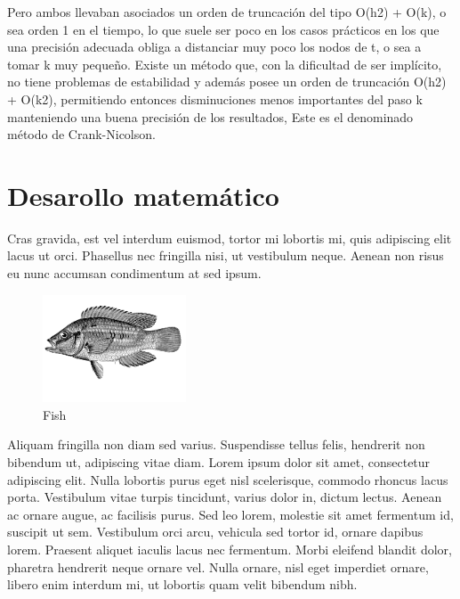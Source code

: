 \documentclass[11pt]{article} %
\begin{document}
Pero ambos llevaban asociados un orden de truncación del tipo O(h2) + O(k), o sea orden 1 en el tiempo, lo que suele ser poco en los casos prácticos en los que una precisión adecuada obliga a distanciar muy poco los nodos de t, o sea a tomar k muy pequeño. Existe un método que, con la dificultad de ser implícito, no tiene problemas de estabilidad y además posee un orden de truncación O(h2) + O(k2), permitiendo entonces disminuciones menos importantes del paso k manteniendo una buena precisión de los resultados, Este es el denominado método de Crank-Nicolson.


\section*{Desarollo matemático}

Cras gravida, est vel interdum euismod, tortor mi lobortis mi, quis adipiscing elit lacus ut orci. Phasellus nec fringilla nisi, ut vestibulum neque. Aenean non risus eu nunc accumsan condimentum at sed ipsum.
\begin{figure} %
\begin{center}
\includegraphics[width=0.38\textwidth]{fish.png}
\end{center}
\caption{Fish}
\end{figure}
Aliquam fringilla non diam sed varius. Suspendisse tellus felis, hendrerit non bibendum ut, adipiscing vitae diam. Lorem ipsum dolor sit amet, consectetur adipiscing elit. Nulla lobortis purus eget nisl scelerisque, commodo rhoncus lacus porta. Vestibulum vitae turpis tincidunt, varius dolor in, dictum lectus. Aenean ac ornare augue, ac facilisis purus. Sed leo lorem, molestie sit amet fermentum id, suscipit ut sem. Vestibulum orci arcu, vehicula sed tortor id, ornare dapibus lorem. Praesent aliquet iaculis lacus nec fermentum. Morbi eleifend blandit dolor, pharetra hendrerit neque ornare vel. Nulla ornare, nisl eget imperdiet ornare, libero enim interdum mi, ut lobortis quam velit bibendum nibh.
\end{document}
